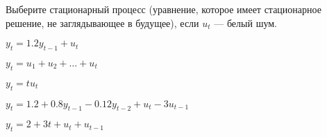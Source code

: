 
\begin{question}
Выберите стационарный процесс (уравнение, которое имеет стационарное решение, не заглядывающее в будущее), если \(u_t\) --- белый шум.
\begin{answerlist}
  \item \(y_t = 1.2 y_{t-1} + u_t\)
  \item \(y_t = u_1 + u_2 + \ldots + u_t\)
  \item \(y_t = tu_{t}\)
  \item \(y_t = 1.2 + 0.8 y_{t-1} - 0.12 y_{t-2} + u_t - 3u_{t-1}\)
  \item \(y_t = 2 + 3t + u_t + u_{t-1}\)
\end{answerlist}
\end{question}


